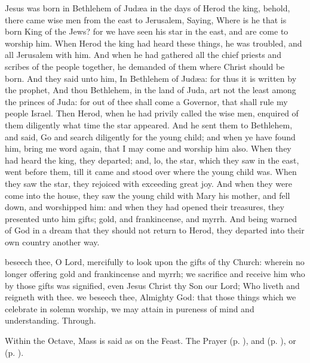  Jesus was born in Bethlehem of Jud{\ae}a in the days of Herod the king, behold, there came wise men from the east to Jerusalem, Saying, Where is he that is born King of the Jews? for we have seen his star in the east, and are come to worship him. When Herod the king had heard these things, he was troubled, and all Jerusalem with him. And when he had gathered all the chief priests and scribes of the people together, he demanded of them where Christ should be born. And they said unto him, In Bethlehem of Jud{\ae}a: for thus it is written by the prophet, And thou Bethlehem, in the land of Juda, art not the least among the princes of Juda: for out of thee shall come a Governor, that shall rule my people Israel. Then Herod, when he had privily called the wise men, enquired of them diligently what time the star appeared. And he sent them to Bethlehem, and said, Go and search diligently for the young child; and when ye have found him, bring me word again, that I may come and worship him also. When they had heard the king, they departed; and, lo, the star, which they saw in the east, went before them, till it came and stood over where the young child was. When they saw the star, they rejoiced with exceeding great joy. And when they were come into the house, they saw the young child with Mary his mother,  and fell down, and worshipped him: and when they had opened their treasures, they presented unto him gifts; gold, and frankincense, and myrrh. And being warned of God in a dream that they should not return to Herod, they departed into their own country another way.

\secret\label{EpiphanyMassSecret}
 beseech thee, O Lord, mercifully to look upon the gifts of thy Church: wherein no longer offering gold and frankincense and myrrh; we sacrifice and receive him who by those gifts was signified, even Jesus Christ thy Son our Lord; Who liveth and reigneth with thee.
\postcommunion\label{EpiphanyMassPostcommunion}
 we beseech thee, Almighty God: that those things which we celebrate in solemn worship, we may attain in pureness of mind and understanding. Through.
\begin{rubric}
    Within the Octave, Mass is said as on the Feast. The  Prayer  (p. \pageref{SPMaryPostChristmas}), and   (p. \pageref{SPAgainst}), or  (p. \pageref{SPChiefBishop}).
\end{rubric}


